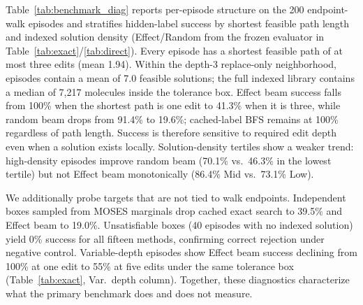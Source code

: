 Table~\ref{tab:benchmark_diag} reports per-episode structure on the 200 endpoint-walk episodes and stratifies hidden-label success by shortest feasible path length and indexed solution density (Effect/Random from the frozen evaluator in Table~\ref{tab:exact}/\ref{tab:direct}). Every episode has a shortest feasible path of at most three edits (mean 1.94). Within the depth-3 replace-only neighborhood, episodes contain a mean of 7.0 feasible solutions; the full indexed library contains a median of 7{,}217 molecules inside the tolerance box. Effect beam success falls from 100\% when the shortest path is one edit to 41.3\% when it is three, while random beam drops from 91.4\% to 19.6\%; cached-label BFS remains at 100\% regardless of path length. Success is therefore sensitive to required edit depth even when a solution exists locally. Solution-density tertiles show a weaker trend: high-density episodes improve random beam (70.1\% vs.\ 46.3\% in the lowest tertile) but not Effect beam monotonically (86.4\% Mid vs.\ 73.1\% Low).

We additionally probe targets that are not tied to walk endpoints. Independent boxes sampled from MOSES marginals drop cached exact search to 39.5\% and Effect beam to 19.0\%. Unsatisfiable boxes (40 episodes with no indexed solution) yield 0\% success for all fifteen methods, confirming correct rejection under negative control. Variable-depth episodes show Effect beam success declining from 100\% at one edit to 55\% at five edits under the same tolerance box (Table~\ref{tab:exact}, Var.\ depth column). Together, these diagnostics characterize what the primary benchmark does and does not measure.

